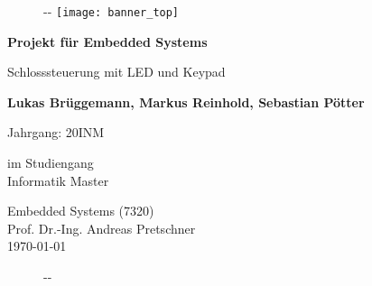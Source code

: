
\begin{titlepage}
    
    \begin{figure}[t]
        \begin{adjustwidth}{-\oddsidemargin-1in}{-\rightmargin}
            \centering
            \texttt{[image: banner\_top]}
        \end{adjustwidth}
    \end{figure}

    \begin{flushleft}
        \vspace*{1cm}
        \Huge
        \textbf{Projekt für Embedded Systems}
        
        \vspace{0.5cm}
        \LARGE
        Schlosssteuerung mit LED und Keypad
        
        \vspace{1.5cm}
        \textbf{Lukas Brüggemann, Markus Reinhold, Sebastian Pötter}
        
        \vspace{0.5cm}
        \large
        Jahrgang: 20INM
        
        \vspace{0.5cm}
        im Studiengang\\
        Informatik Master
        
    \end{flushleft}        

    \vspace{0.5cm}
    \begin{flushright}
        Embedded Systems (7320)\\
        Prof. Dr.-Ing. Andreas Pretschner\\
        \vspace{0.5cm}
        \today
    \end{flushright}    
    
    \begin{figure}[b]
        \begin{adjustwidth}{-\oddsidemargin-1in}{-\rightmargin}
            \centering
        \end{adjustwidth}
    \end{figure}

\end{titlepage}

\restoregeometry